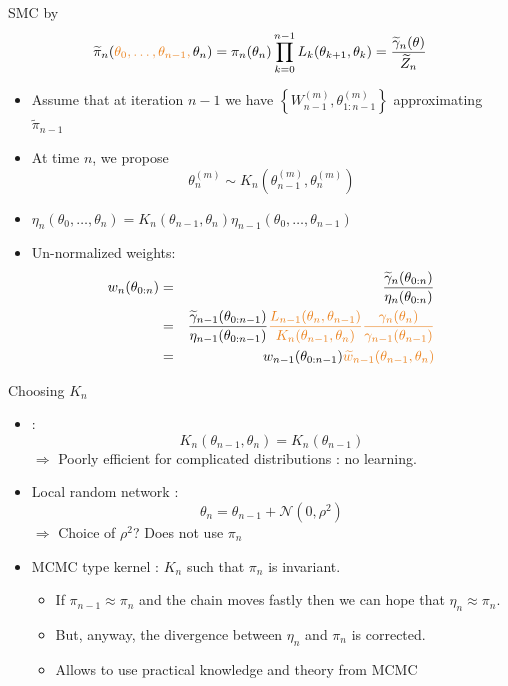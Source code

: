 \begin{frame}{SMC by {\small \cite{delmoral06}}}
$$\widetilde{\pi}_n(\vert \theta_0,\dots,\theta_{n-1}, \noir \theta_n) =\pi_n(\theta_n)\prod_{k=0}^{n-1}L_{k}(\theta_{k+1}, \theta_{k}) = \frac{\widetilde \gamma_n(\theta)}{\widetilde Z_n}$$
\begin{itemize}
\item Assume that at iteration  $n-1$ we have  $\left\{ W_{n-1}^{(m)}, \theta^{(m)}_{1:n-1}\right\}$ approximating  $\widetilde{\pi}_{n-1}$

\item At time $n$, we propose $$\theta_{n}^{(m)} \sim K_n(\theta_{n-1}^{(m)}, \theta_{n}^{(m)})$$
\item $\eta_n(\theta_0, \dots,\theta_n) =  K_n(\theta_{n-1}, \theta_{n}) \eta_{n-1}(\theta_0, \dots,\theta_{n-1})$
\item  Un-normalized weights: 
\begin{eqnarray*}
w_{n}(\theta_{0:n})& =& \frac{\widetilde{\gamma}_n(\theta_{0:n})}{\eta_n(\theta_{0:n})} \\ 
&=&  \frac{\widetilde{\gamma}_{n-1}(\theta_{0:{n-1}})}{\eta_{n-1}(\theta_{0:n-1})} \vert \frac{L_{n-1}(\theta_{n}, \theta_{n-1})}{ K_n(\theta_{n-1}, \theta_{n})}\frac{\gamma_n(\theta_n)}{\gamma_{n-1}(\theta_{n-1})} \noir \\
&=&w_{n-1}(\theta_{0:n-1}) \vert \widetilde{w}_{n-1}(\theta_{n-1},\theta_n) \noir
\end{eqnarray*}

\end{itemize}

\end{frame}

\begin{frame}{Choosing $K_n$}
\begin{itemize}
\item{} \noir : $$K_n(\theta_{n-1},\theta_n) = K_n(\theta_{n-1})$$
\vert $\Rightarrow$ \noir Poorly efficient for complicated distributions : no learning. 
\item \vert Local random network \noir : $$\theta_n = \theta_{n-1} + \mathcal{N}(0,\rho^2)$$
\vert $\Rightarrow$  \noir Choice of  $\rho^2$? Does not use  $\pi_n$ 
\item\vert MCMC type kernel \noir :  $K_n$ such that  $\pi_n$ is invariant. 
\begin{itemize}
\item If  $\pi_{n-1} \approx \pi_n$ and the chain moves fastly then we can hope  that $\eta_n \approx \pi_n$. 
\item But,  anyway, the divergence between  $\eta_n$ and $\pi_n$ is corrected. 
\item Allows to use practical knowledge and theory from  MCMC
\end{itemize}
\end{itemize}
\end{frame}



